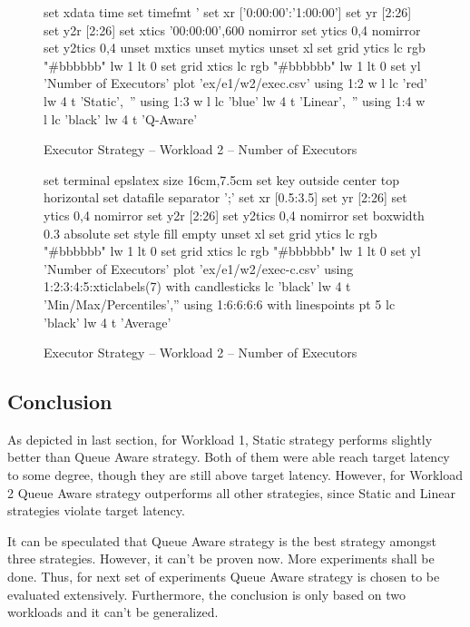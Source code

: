\begin{figure}[!htbp]
\begin{minipage}[h]{\linewidth}
\begin{gnuplot}[terminal=epslatex, terminaloptions=color colortext]
			set xdata time
			set timefmt '%
			set xr ['0:00:00':'1:00:00']
			set yr [2:26]
			set y2r [2:26]
			set xtics '00:00:00',600 nomirror
			set ytics 0,4 nomirror
			set y2tics 0,4
			unset mxtics
			unset mytics
			unset xl
            set grid ytics lc rgb "#bbbbbb" lw 1 lt 0
            set grid xtics lc rgb "#bbbbbb" lw 1 lt 0
			set yl 'Number of Executors'
			plot 'ex/e1/w2/exec.csv' using 1:2 w l lc 'red' lw 4 t 'Static',\
			'' using 1:3 w l lc 'blue' lw 4 t 'Linear',\
			'' using 1:4 w l lc 'black' lw 4 t 'Q-Aware'
		\end{gnuplot}
		\caption{Executor Strategy -- Workload 2 -- Number of Executors}
		\label{eval:f:e1:w2:exec}
	\end{minipage}
\end{figure}
\begin{figure}[!htbp]
\centering
\begin{gnuplot}[terminal=epslatex, terminaloptions=color colortext]
set terminal epslatex size 16cm,7.5cm
set key outside center top horizontal
set datafile separator ';'
set xr [0.5:3.5]
set yr [2:26]
set ytics 0,4 nomirror
set y2r [2:26]
set y2tics 0,4 nomirror
set boxwidth 0.3 absolute
set style fill empty
unset xl
set grid ytics lc rgb "#bbbbbb" lw 1 lt 0
set grid xtics lc rgb "#bbbbbb" lw 1 lt 0
set yl 'Number of Executors'
plot 'ex/e1/w2/exec-c.csv' using 1:2:3:4:5:xticlabels(7) with candlesticks lc 'black' lw 4 t 'Min/Max/Percentiles','' using 1:6:6:6:6 with linespoints pt 5 lc 'black' lw 4 t 'Average' 
\end{gnuplot}
\caption{Executor Strategy -- Workload 2 -- Number of Executors}
\label{eval:f:e1:w2:exec-c}
\end{figure}
\FloatBarrier
\subsection{Conclusion}
As depicted in last section, for Workload 1, Static strategy performs slightly better than Queue Aware strategy. Both of them were able reach target latency to some degree, though they are still above target latency. However, for Workload 2 Queue Aware strategy outperforms all other strategies, since Static and Linear strategies violate target latency.

It can be speculated that Queue Aware strategy is the best strategy amongst three strategies. However, it can't be proven now. More experiments shall be done. Thus, for next set of experiments Queue Aware strategy is chosen to be evaluated extensively. Furthermore, the conclusion is only based on two workloads and it can't be generalized.
\clearpage
